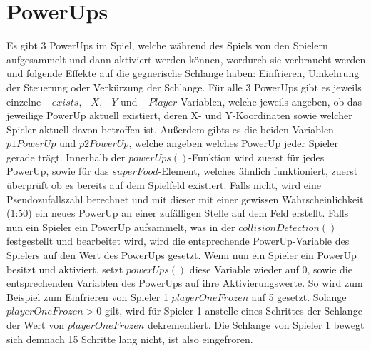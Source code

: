 \section{PowerUps}
\label{PowerUps}
%
Es gibt 3 PowerUps im Spiel, welche während des Spiels von den Spielern aufgesammelt und dann aktiviert werden können, wordurch sie verbraucht werden und folgende Effekte auf die gegnerische Schlange haben: Einfrieren, Umkehrung der Steuerung oder Verkürzung der Schlange. Für alle 3 PowerUps gibt es jeweils einzelne $-exists, -X, -Y$ und $-Player$ Variablen, welche jeweils angeben, ob das jeweilige PowerUp aktuell existiert, deren X- und Y-Koordinaten sowie welcher Spieler aktuell davon betroffen ist. Außerdem gibts es die beiden Variablen $p1PowerUp$ und $p2PowerUp$, welche angeben welches PowerUp jeder Spieler gerade trägt.
Innerhalb der $powerUps()$-Funktion wird zuerst für jedes PowerUp, sowie für das $superFood$-Element, welches ähnlich funktioniert, zuerst überprüft ob es bereits auf dem Spielfeld existiert. Falls nicht, wird eine Pseudozufallszahl berechnet und mit dieser mit einer gewissen Wahrscheinlichkeit (1:50) ein neues PowerUp an einer zufälligen Stelle auf dem Feld erstellt. Falls nun ein Spieler ein PowerUp aufsammelt, was in der $collisionDetection()$ festgestellt und bearbeitet wird, wird die entsprechende PowerUp-Variable des Spielers auf den Wert des PowerUps gesetzt. Wenn nun ein Spieler ein PowerUp besitzt und aktiviert, setzt $powerUps()$ diese Variable wieder auf 0, sowie die entsprechenden Variablen des PowerUps auf ihre Aktivierungswerte. So wird zum Beispiel zum Einfrieren von Spieler 1 $playerOneFrozen$ auf 5 gesetzt. Solange $playerOneFrozen > 0$ gilt, wird für Spieler 1 anstelle eines Schrittes der Schlange der Wert von $playerOneFrozen$ dekrementiert. Die Schlange von Spieler 1 bewegt sich demnach 15 Schritte lang nicht, ist also eingefroren. 
%
